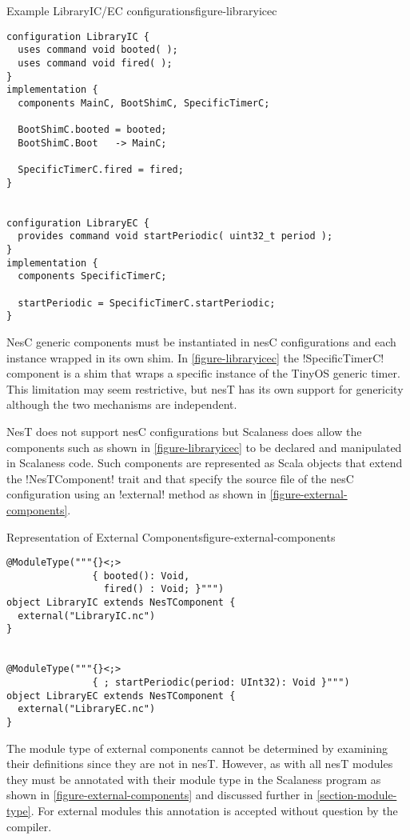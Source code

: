 \singlespace
\begin{fpfig}[tbhp]{Example LibraryIC/EC configurations}{figure-libraryicec}
{
\begin{lstlisting}[language=nesC]
configuration LibraryIC {
  uses command void booted( );
  uses command void fired( );
}
implementation {
  components MainC, BootShimC, SpecificTimerC;

  BootShimC.booted = booted;
  BootShimC.Boot   -> MainC;

  SpecificTimerC.fired = fired;
}


configuration LibraryEC {
  provides command void startPeriodic( uint32_t period );
}
implementation {
  components SpecificTimerC;

  startPeriodic = SpecificTimerC.startPeriodic;
}
\end{lstlisting}
}
\end{fpfig}
\primaryspacing

NesC generic components must be instantiated in nesC configurations and each instance wrapped in
its own shim. In \autoref{figure-libraryicec} the !SpecificTimerC! component is a shim that
wraps a specific instance of the TinyOS generic timer. This limitation may seem restrictive, but
nesT has its own support for genericity although the two mechanisms are independent.

NesT does not support nesC configurations but Scalaness does allow the components such as shown
in \autoref{figure-libraryicec} to be declared and manipulated in Scalaness code. Such
components are represented as Scala objects that extend the !NesTComponent! trait and that
specify the source file of the nesC configuration using an !external! method as shown in
\autoref{figure-external-components}.

\singlespace
\begin{fpfig}[tbhp]{Representation of External Components}{figure-external-components}
{
\begin{lstlisting}[language=scalaness]
@ModuleType("""{}<;>
               { booted(): Void,
                 fired() : Void; }""")
object LibraryIC extends NesTComponent {
  external("LibraryIC.nc")
}


@ModuleType("""{}<;>
               { ; startPeriodic(period: UInt32): Void }""")
object LibraryEC extends NesTComponent {
  external("LibraryEC.nc")
}
\end{lstlisting}
}
\end{fpfig}
\primaryspacing

The module type of external components cannot be determined by examining their definitions since
they are not in nesT. However, as with all nesT modules they must be annotated with their module
type in the Scalaness program as shown in \autoref{figure-external-components} and discussed
further in \autoref{section-module-type}. For external modules this annotation is accepted
without question by the compiler.

